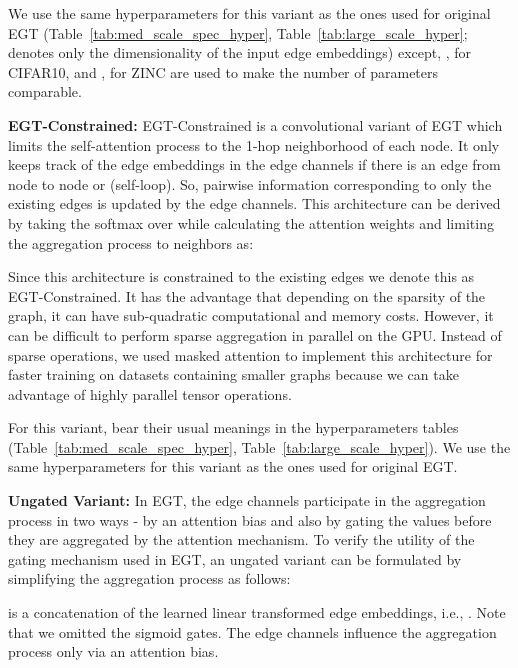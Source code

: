 \documentclass[sigconf,authorversion]{acmart}
\begin{document}
We use the same hyperparameters for this variant as the ones used for original EGT (Table~\ref{tab:med_scale_spec_hyper}, Table~\ref{tab:large_scale_hyper};  denotes only the dimensionality of the input edge embeddings) except, ,  for CIFAR10, and ,  for ZINC are used to make the number of parameters comparable.

\noindent\textbf{EGT-Constrained:}
EGT-Constrained is a convolutional variant of EGT which limits the self-attention process to the 1-hop neighborhood of each node. It only keeps track of the edge embeddings  in the edge channels if there is an edge from node  to node  or  (self-loop). So, pairwise information corresponding to only the existing edges is updated by the edge channels. This architecture can be derived by taking the softmax over  while calculating the attention weights  and limiting the aggregation process to neighbors as:

Since this architecture is constrained to the existing edges we denote this as EGT-Constrained. It has the advantage that depending on the sparsity of the graph, it can have sub-quadratic computational and memory costs. However, it can be difficult to perform sparse aggregation in parallel on the GPU. Instead of sparse operations, we used masked attention to implement this architecture for faster training on datasets containing smaller graphs because we can take advantage of highly parallel tensor operations.

For this variant,  bear their usual meanings in the hyperparameters tables (Table~\ref{tab:med_scale_spec_hyper}, Table~\ref{tab:large_scale_hyper}). We use the same hyperparameters for this variant as the ones used for original EGT.

\noindent\textbf{Ungated Variant:}
In EGT, the edge channels participate in the aggregation process in two ways - by an attention bias and also by gating the values before they are aggregated by the attention mechanism. To verify the utility of the gating mechanism used in EGT, an ungated variant can be formulated by simplifying the aggregation process as follows: 

 is a concatenation of the learned linear transformed edge embeddings, i.e., . Note that we omitted the sigmoid gates. The edge channels influence the aggregation process only via an attention bias.
\end{document}
